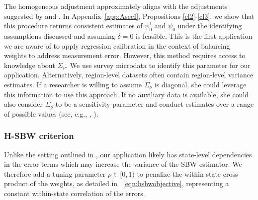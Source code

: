 \documentclass[aoas]{imsart}
\theoremstyle{plain}
\theoremstyle{remark}
\begin{document}
The homogeneous adjustment approximately aligns with the adjustments suggested by \cite{carroll2006measurement} and \cite{gleser1992importance}. In Appendix~\ref{app:AsecI}, Propositions \ref{cl2}-\ref{cl3}, we show that this procedure returns consistent estimates of $\psi_0^1$ and $\psi_0$ under the identifying assumptions discussed and assuming $\delta = 0$ is feasible. This is the first application we are aware of to apply regression calibration in the context of balancing weights to address measurement error. However, this method requires access to knowledge about $\Sigma_{\nu}$. We use survey microdata to identify this parameter for our application. Alternatively, region-level datasets often contain region-level variance estimates. If a researcher is willing to assume $\Sigma_{\nu}$ is diagonal, she could leverage this information to use this approach. If no auxiliary data is available, she could also consider $\Sigma_{\nu}$ to be a sensitivity parameter and conduct estimates over a range of possible values (see, e.g., \cite{illenberger2020impact}, \cite{huque2014impact}). 


\subsubsection{H-SBW criterion}\label{sssec:hsbw}

Unlike the setting outlined in \cite{zubizarreta2015stable}, our application likely has state-level dependencies in the error terms which may increase the variance of the SBW estimator. We therefore add a tuning parameter $\rho \in [0, 1)$ to penalize the within-state cross product of the weights, as detailed in ~\eqref{eqn:hsbwobjective}, representing a constant within-state correlation of the errors.
\end{document}
